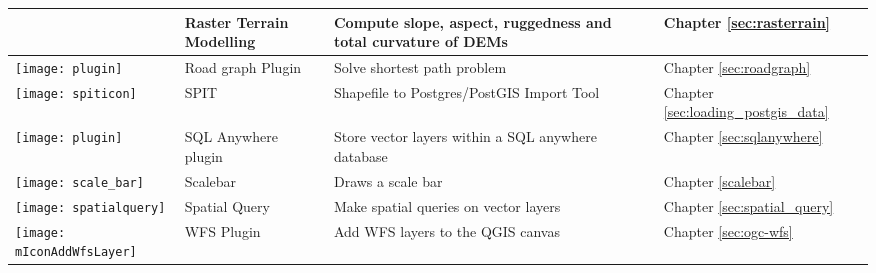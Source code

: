 {\begin{longtable}{|p{1.2cm}|p{3.8cm}|p{7.5cm}|p{3cm}|}
& Raster Terrain Modelling \index{plugins!Raster Terrain Modelling}& Compute slope, aspect,
ruggedness and total curvature of DEMs & Chapter \ref{sec:rasterrain}\\
\hline
\texttt{[image: plugin]}
 & Road graph Plugin \index{plugins!road graph} & Solve shortest path problem & Chapter \ref{sec:roadgraph} \\
\hline
\texttt{[image: spiticon]}
 & SPIT \index{plugins!spit} & Shapefile to Postgres/PostGIS Import Tool & Chapter \ref{sec:loading_postgis_data} \\
 \hline
\texttt{[image: plugin]}
 & SQL Anywhere plugin \index{plugins!SQL anywhere} &  Store vector layers 
within a SQL anywhere database & Chapter \ref{sec:sqlanywhere} \\
 \hline
\texttt{[image: scale\_bar]}
 & Scalebar \index{plugins!scalebar}& Draws a scale bar & Chapter \ref{scalebar} \\
\hline
\texttt{[image: spatialquery]}
 & Spatial Query & Make spatial queries on vector layers & Chapter \ref{sec:spatial_query} \\
\hline
\texttt{[image: mIconAddWfsLayer]}
 & WFS Plugin & Add WFS layers to the QGIS canvas & Chapter \ref{sec:ogc-wfs} \\
\hline
\end{longtable}}

\newpage

